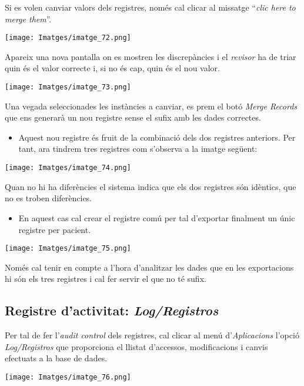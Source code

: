\documentclass[
]{article}
\providecommand{\tightlist}{%
  \setlength{\itemsep}{0pt}\setlength{\parskip}{0pt}}
\begin{document}
Si es volen canviar valors dels registres, només cal clicar al missatge ``\emph{clic here to merge them}''.

\texttt{[image: Imatges/imatge\_72.png]}

Apareix una nova pantalla on es mostren les discrepàncies i el \emph{revisor} ha de triar quin és el valor correcte i, si no és cap, quin és el nou valor.

\texttt{[image: Imatges/imatge\_73.png]}

Una vegada seleccionades les instàncies a canviar, es prem el botó \emph{Merge Records} que ens generarà un nou registre sense el sufix amb les dades correctes.

\begin{itemize}
\tightlist
\item
  Aquest nou registre és fruit de la combinació dels dos registres anteriors. Per tant, ara tindrem tres registres com s'observa a la imatge següent:
\end{itemize}

\texttt{[image: Imatges/imatge\_74.png]}

Quan no hi ha diferències el sistema indica que els dos registres són idèntics, que no es troben diferències.

\begin{itemize}
\tightlist
\item
  En aquest cas cal crear el registre comú per tal d'exportar finalment un únic registre per pacient.
\end{itemize}

\texttt{[image: Imatges/imatge\_75.png]}

Només cal tenir en compte a l'hora d'analitzar les dades que en les exportacions hi són els tres registres i cal fer servir el que no té sufix.

\hypertarget{registre-dactivitat-logregistros}{%
\subsection{\texorpdfstring{\textbf{Registre d'activitat: \emph{Log/Registros}}}{Registre d'activitat: Log/Registros}}\label{registre-dactivitat-logregistros}}

Per tal de fer l'\emph{audit control} dels registres, cal clicar al menú d'\emph{Aplicacions} l'opció \emph{Log/Registros} que proporciona el llistat d'accessos, modificacions i canvis efectuats a la base de dades.

\texttt{[image: Imatges/imatge\_76.png]}
\end{document}
